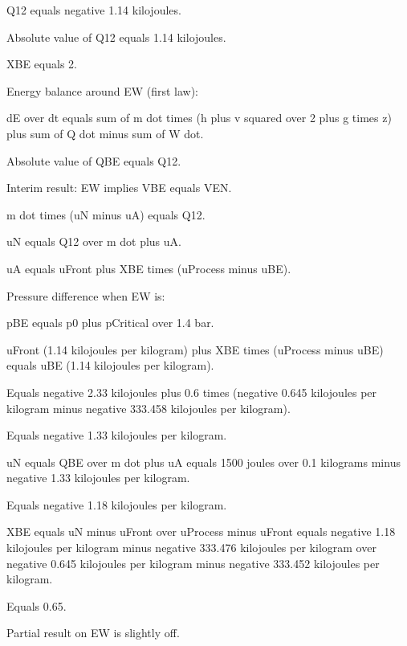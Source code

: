 Q12 equals negative 1.14 kilojoules.

Absolute value of Q12 equals 1.14 kilojoules.

XBE equals 2.

Energy balance around EW (first law):

dE over dt equals sum of m dot times (h plus v squared over 2 plus g times z) plus sum of Q dot minus sum of W dot.

Absolute value of QBE equals Q12.

Interim result: EW implies VBE equals VEN.

m dot times (uN minus uA) equals Q12.

uN equals Q12 over m dot plus uA.

uA equals uFront plus XBE times (uProcess minus uBE).

Pressure difference when EW is:

pBE equals p0 plus pCritical over 1.4 bar.

uFront (1.14 kilojoules per kilogram) plus XBE times (uProcess minus uBE) equals uBE (1.14 kilojoules per kilogram).

Equals negative 2.33 kilojoules plus 0.6 times (negative 0.645 kilojoules per kilogram minus negative 333.458 kilojoules per kilogram).

Equals negative 1.33 kilojoules per kilogram.

uN equals QBE over m dot plus uA equals 1500 joules over 0.1 kilograms minus negative 1.33 kilojoules per kilogram.

Equals negative 1.18 kilojoules per kilogram.

XBE equals uN minus uFront over uProcess minus uFront equals negative 1.18 kilojoules per kilogram minus negative 333.476 kilojoules per kilogram over negative 0.645 kilojoules per kilogram minus negative 333.452 kilojoules per kilogram.

Equals 0.65.

Partial result on EW is slightly off.